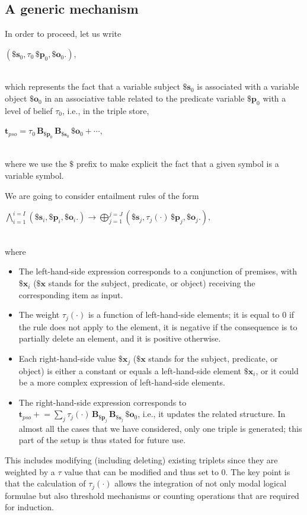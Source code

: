 \documentclass[sn-mathphys]{sn-jnl}
\newcommand{\eqline}[1]{~\vspace{0.1cm}\\\centerline{$#1$}\vspace{0.1cm}\\}
\begin{document}
\subsection{A generic mechanism}

In order to proceed, let us write
\eqline{(\mathbf{\$s}_0,  \tau_0 \, \mathbf{\$p}_0,  \mathbf{\$o}_0 .),}
which represents the fact that a variable subject $\mathbf{\$s}_0$ is associated with a variable object $\mathbf{\$o}_0$ in an associative table related to the predicate variable $\mathbf{\$p}_0$ with a level of belief $\tau_0$, i.e., in the triple store,
\eqline{\mathbf{t}_{pso} = \tau_0 \, \mathbf{B}_{\mathbf{\$p}_0} \, \mathbf{B}_{\mathbf{\$s}_0} \, \mathbf{\$o}_0 + \cdots,}
where we use the $\$$ prefix to make explicit the fact that a given symbol is a variable symbol.

We are going to consider entailment rules of the form
\eqline{\bigwedge_{i=1}^{i=I} (\mathbf{\$s}_i,  \mathbf{\$p}_i,  \mathbf{\$o}_i .) \rightarrow \bigoplus_{j=1}^{j=J} (\mathbf{\$s}_j,  \tau_j(\cdot) \, \mathbf{\$p}_j,  \mathbf{\$o}_j .),}
where
\begin{itemize}
\item The left-hand-side expression corresponds to a conjunction of premises, with $\mathbf{\$x}_i$ ($\mathbf{\$x}$ stands for the subject, predicate, or object) receiving the corresponding item as input.
\item The weight $\tau_j(\cdot)$ is a function of left-hand-side elements; it is equal to $0$ if the rule does not apply to the element, it is negative if the consequence is to partially delete an element, and it is positive otherwise.
\item Each right-hand-side value $\mathbf{\$x}_j$ ($\mathbf{\$x}$ stands for the subject, predicate, or object) is either a constant or equals a left-hand-side element $\mathbf{\$x}_i$, or it could be a more complex expression of left-hand-side elements.
\item The right-hand-side expression corresponds to $\mathbf{t}_{pso} \mathrel{+}= \sum_j \tau_j(\cdot) \, \mathbf{B}_{\mathbf{\$p}_j} \, \mathbf{B}_{\mathbf{\$s}_j} \, \mathbf{\$o}_0$, i.e., it updates the related structure. In almost all the cases that we have considered, only one triple is generated; this part of the setup is thus stated for future use.
\end{itemize}

This includes modifying (including deleting) existing triplets since they are weighted by a $\tau$ value that can be modified and thus set to $0$. The key point is that the calculation of $\tau_j(\cdot)$ allows the integration of not only modal logical formulae but also threshold mechanisms or counting operations that are required for induction.
\end{document}
